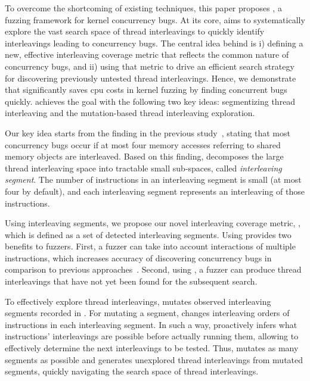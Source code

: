 To overcome the shortcoming of existing techniques, this paper proposes
\sys, a fuzzing framework for kernel concurrency bugs. 
At its core, \sys aims to systematically explore the vast search space of thread
interleavings to quickly identify
interleavings leading to concurrency bugs. The central idea behind \sys
is i) defining a new, effective interleaving coverage metric that reflects the 
common nature of concurrency bugs, and ii) using that metric to drive 
an efficient search strategy for discovering previously untested thread interleavings.
Hence, we demonstrate that \sys significantly saves cpu costs
in kernel fuzzing by finding concurrent bugs quickly.
\sys achieves the goal with the following two key ideas:
segmentizing thread interleaving and the mutation-based thread interleaving exploration.

%
Our key idea starts from the finding in the previous
study~\cite{learningfrommistakes}, stating that most concurrency bugs
occur if at most four memory accesses referring to shared memory
objects are interleaved.
%
Based on this finding, \sys decomposes the large thread interleaving
space into tractable small sub-spaces, called \textit{interleaving
  segment}. The number of instructions in an interleaving segment is
small (at most four by default), and each interleaving segment
represents an interleaving of those instructions.

Using interleaving segments, we propose our novel interleaving
coverage metric, \textit{\intcov}, which is defined as a set of
detected interleaving segments.
%
Using \intcov provides two benefits to fuzzers. First, a fuzzer can
take into account interactions of multiple instructions, which
increases accuracy of discovering concurrency bugs in comparison to
previous approaches~\cite{krace, conzzer}.  Second, using \intcov, a
fuzzer can produce thread interleavings that have not yet been found
for the subsequent search.

%
To effectively explore thread interleavings, \sys mutates observed
interleaving segments recorded in \intcov. For mutating a segment,
\sys changes interleaving orders of instructions in each
interleaving segment.
%
In such a way, \sys proactively infers what instructions'
interleavings are possible before actually running them, allowing \sys
to effectively determine the next interleavings to be tested.
%
Thus, \sys mutates as many segments as possible and generates
unexplored thread interleavings from mutated segments, quickly
navigating the search space of thread interleavings.


